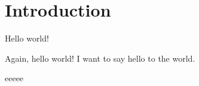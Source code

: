 \chapter{Introduction}

Hello world!

Again, hello world!
I want to say hello to the world.

eeeee
\blindtext[10]